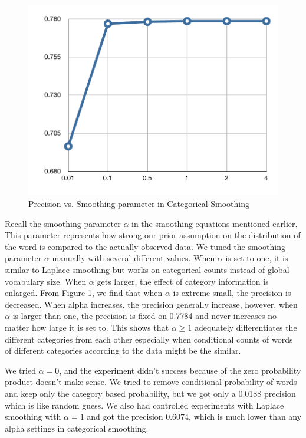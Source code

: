 \begin{figure}[ht]
\vskip 0.2in
\begin{center}
\centerline{\includegraphics[width=\columnwidth]{pvsalpha}}
\caption{Precision vs. Smoothing parameter in Categorical Smoothing}
\label{fig-p-vs-alpha}
\end{center}
\vskip -0.2in
\end{figure}

Recall the smoothing parameter $\alpha$ in the smoothing equations mentioned earlier. This parameter represents how strong our prior assumption on the distribution of the word is compared to the actually observed data. We tuned the smoothing parameter $\alpha$ manually with several different values. When $\alpha$ is set to one, it is similar to Laplace smoothing but works on categorical counts instead of global vocabulary size. When $\alpha$ gets larger, the effect of category information is enlarged. From Figure \ref{fig-p-vs-alpha}, we find that when $\alpha$ is extreme small, the precision is decreased. When alpha increases, the precision generally increase, however, when $\alpha$ is larger than one, the precision is fixed on 0.7784 and never increases no matter how large it is set to. This shows that $\alpha \ge 1$ adequately differentiates the different categories from each other especially when conditional counts of words of different categories according to the data might be the similar. 

We tried $\alpha=0$, and the experiment didn't success because of the zero probability product doesn't make sense. We tried to remove conditional probability of words and keep only the category based probability, but we got only a 0.0188 precision which is like random guess. We also had controlled experiments with Laplace smoothing with $\alpha=1$ and got the precision 0.6074, which is much lower than any alpha settings in categorical smoothing. 



